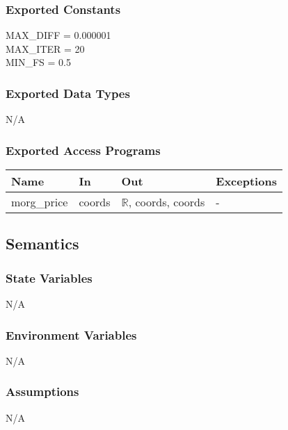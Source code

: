 \documentclass[12pt, titlepage]{article}
\begin{document}
\subsubsection{Exported Constants}
MAX\_DIFF = 0.000001\\
MAX\_ITER = 20\\
MIN\_FS = 0.5\\

\subsubsection{Exported Data Types}
N/A

\subsubsection{Exported Access Programs}

\begin{center}
	\renewcommand*{\arraystretch}{1.5}
	\begin{tabular} {p{}  p{}  p{} 
			p{} } \hline 
		\textbf{Name} & \textbf{In} & \textbf{Out} & \textbf{Exceptions} \\ 
		\hline

  morg\_price & coords & $\mathbb{R}$, coords, coords & - \\ \hline
\end{tabular}
\end{center}

\subsection{Semantics}

\subsubsection{State Variables}
N/A

\subsubsection{Environment Variables}
N/A

\subsubsection{Assumptions}
N/A
 
\end{document}
